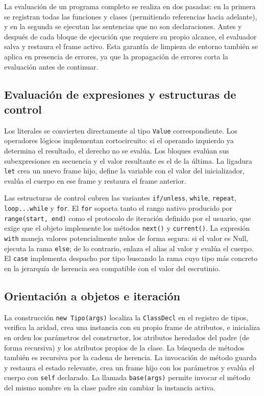 \documentclass[11pt,a4paper]{article}
\begin{document}
La evaluación de un programa completo se realiza en dos pasadas: en la primera se registran todas las funciones y clases (permitiendo referencias hacia adelante), y en la segunda se ejecutan las sentencias que no son declaraciones. Antes y después de cada bloque de ejecución que requiere su propio alcance, el evaluador salva y restaura el frame activo. Esta garantía de limpieza de entorno también se aplica en presencia de errores, ya que la propagación de errores corta la evaluación antes de continuar.

\subsection{Evaluación de expresiones y estructuras de control}

Los literales se convierten directamente al tipo \texttt{Value} correspondiente. Los operadores lógicos implementan cortocircuito: si el operando izquierdo ya determina el resultado, el derecho no se evalúa. Los bloques evalúan sus subexpresiones en secuencia y el valor resultante es el de la última. La ligadura \texttt{let} crea un nuevo frame hijo, define la variable con el valor del inicializador, evalúa el cuerpo en ese frame y restaura el frame anterior.

Las estructuras de control cubren las variantes \texttt{if/unless}, \texttt{while}, \texttt{repeat}, \texttt{loop...while} y \texttt{for}. El \texttt{for} soporta tanto el rango nativo producido por \texttt{range(start, end)} como el protocolo de iteración definido por el usuario, que exige que el objeto implemente los métodos \texttt{next()} y \texttt{current()}. La expresión \texttt{with} maneja valores potencialmente nulos de forma segura: si el valor es Null, ejecuta la rama \texttt{else}; de lo contrario, enlaza el alias al valor y evalúa el cuerpo. El \texttt{case} implementa despacho por tipo buscando la rama cuyo tipo más concreto en la jerarquía de herencia sea compatible con el valor del escrutinio.

\subsection{Orientación a objetos e iteración}

La construcción \texttt{new Tipo(args)} localiza la \texttt{ClassDecl} en el registro de tipos, verifica la aridad, crea una instancia con su propio frame de atributos, e inicializa en orden los parámetros del constructor, los atributos heredados del padre (de forma recursiva) y los atributos propios de la clase. La búsqueda de métodos también es recursiva por la cadena de herencia. La invocación de método guarda y restaura el estado relevante, crea un frame hijo con los parámetros y evalúa el cuerpo con \texttt{self} declarado. La llamada \texttt{base(args)} permite invocar el método del mismo nombre en la clase padre sin cambiar la instancia activa.
\end{document}
